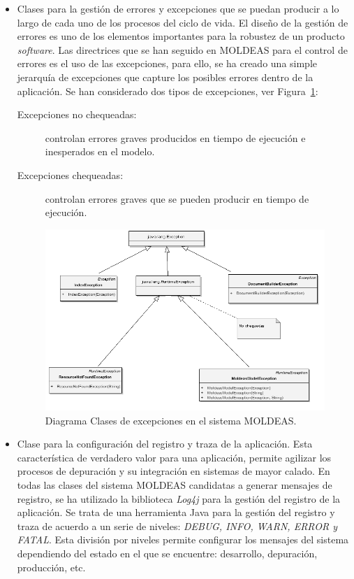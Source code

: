 \begin{itemize}
\item Clases para la gestión de errores y excepciones que se puedan producir a lo largo de cada uno de los procesos 
del ciclo de vida. El diseño de la gestión de errores es uno de los elementos importantes para la
robustez de un producto \textit{software}. Las directrices que se han seguido en MOLDEAS 
para el control de errores es el uso de las excepciones, para ello, se ha creado 
una simple jerarquía de excepciones que capture los posibles errores dentro de la aplicación. 
Se han considerado dos tipos de excepciones, ver Figura~\ref{fig:diagramas/excepciones}:
\begin{description}
\item[Excepciones no chequeadas:]  controlan errores graves producidos en tiempo
de ejecución e inesperados en el modelo. 
\item[Excepciones chequeadas:] controlan errores graves que se pueden producir
en tiempo de ejecución. 
\end{description}


\begin{figure}[htb]
\centering
	\includegraphics[width=16cm]{images/phd/moldeas/excepciones}
\caption{Diagrama Clases de excepciones en el sistema MOLDEAS.}
\label{fig:diagramas/excepciones}
\end{figure}

\item Clase para la configuración del registro y traza de la aplicación. Esta característica de verdadero valor para una aplicación, 
permite agilizar los procesos de depuración y su integración en sistemas de mayor calado. En todas las clases del sistema MOLDEAS candidatas a 
generar mensajes de registro, se ha utilizado la biblioteca \textit{Log4j} para la gestión del registro de la aplicación. Se trata de una herramienta 
Java para la gestión del registro y traza de acuerdo a un serie de 
niveles: \textit{DEBUG, INFO, WARN, ERROR y FATAL}. Esta división por niveles 
permite configurar los mensajes del sistema dependiendo del estado 
en el que se encuentre: desarrollo, depuración, producción, etc.


\end{itemize}
